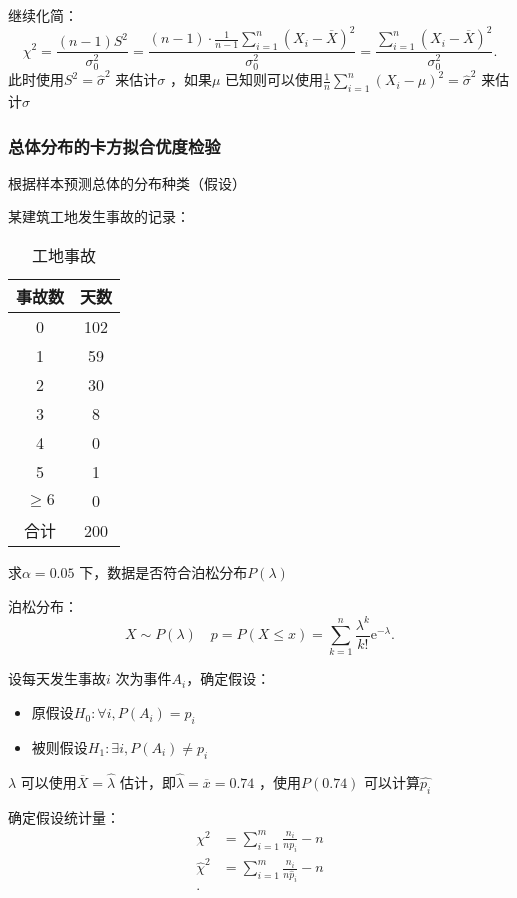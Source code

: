继续化简：\[
    \chi^2 =\frac{\left( n-1 \right)S^2 }{\sigma_0^2 }=\frac{\left( n-1 \right)\cdot \frac{1}{n-1}\sum_{i=1}^{n} \left( X_{i}-\overline{X} \right)^2 }{\sigma_0^2 } =\frac{\sum_{i=1}^{n} \left( X_{i}-\overline{X} \right)^2 }{\sigma_0^2 }
.\]
此时使用$S^2 =\hat{\sigma}^2 $ 来估计$\sigma$ ，如果$\mu$ 已知则可以使用$\frac{1}{n}\sum_{i=1}^{n} \left( X_{i}-\mu \right)^2 =\hat{\sigma}^2 $ 来估计$\sigma$
\subsubsection*{总体分布的卡方拟合优度检验}%
\label{subsub:总体分布的卡方拟合优度检验}
根据样本预测总体的分布种类（假设）
\begin{eg}
    某建筑工地发生事故的记录：
    \begin{table}[htpb]
        \centering
        \caption{工地事故}
        \label{tab:工地事故}
        \begin{tabular}{cc}
        \toprule
        事故数 & 天数\\
        \midrule
        0 & 102\\
        1 & 59 \\
        2 & 30 \\
        3 & 8 \\
        4 & 0 \\
        5 & 1 \\
        $\ge 6$ & 0 \\
        合计 & 200\\
        \bottomrule
        \end{tabular}
    \end{table}
    求$\alpha=0.05$ 下，数据是否符合泊松分布$P\left( \lambda \right)$
\end{eg}
\begin{notation}
    泊松分布：
    \[
        X\sim P\left( \lambda \right)\quad p=P\left( X\le x \right)=\sum_{k=1}^{n} \frac{\lambda^{k}}{k!}\mathrm{e}^{-\lambda}
    .\]
\end{notation}
\begin{sol}
    设每天发生事故$i$ 次为事件$A_{i}$，确定假设：
    \begin{itemize}
        \item 原假设$H_0:\forall i,P\left( A_{i} \right)=p_i$
        \item 被则假设$H_1:\exists i,P\left( A_{i} \right)\neq p_i$
    \end{itemize}
    $\lambda$ 可以使用$\overline{X}=\hat{\lambda}$ 估计，即$\hat{\lambda}=\overline{x}=0.74$ ，使用$P\left( 0.74 \right)$ 可以计算$\hat{p_i}$

    确定假设统计量：
    \begin{align*}
        \chi^2 &=\sum_{i=1}^{m} \frac{n_{i}}{np_i}-n\\
        \hat{\chi}^2 &= \sum_{i=1}^{m} \frac{n_{i}}{n\hat{p}_i}-n \\
    .\end{align*}
\end{sol}
